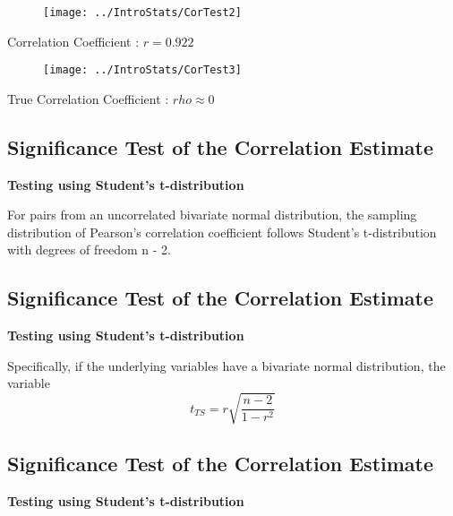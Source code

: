 \begin{figure}
\centering
\texttt{[image: ../IntroStats/CorTest2]}
\end{figure}
{

Correlation Coefficient : $r = 0.922$
}


\begin{figure}
\centering
\texttt{[image: ../IntroStats/CorTest3]}
\end{figure}

{

True Correlation Coefficient : $rho \approx 0$
}



\subsection{Significance Test of the Correlation Estimate}
\Large
\vspace{-1cm}
\textbf{Testing using Student's t-distribution}
\vspace{0.5cm}

For pairs from an uncorrelated bivariate normal distribution, the sampling distribution of Pearson's correlation coefficient follows Student's t-distribution with degrees of freedom n - 2. 



\subsection{Significance Test of the Correlation Estimate}
\Large
\vspace{-1cm}
\textbf{Testing using Student's t-distribution}
\vspace{0.5cm}

Specifically, if the underlying variables have a bivariate normal distribution, the variable
\[ t_{TS} = r\sqrt{\frac{n-2}{1 - r^2}} \]



\subsection{Significance Test of the Correlation Estimate}
\Large
\vspace{-1cm}
\textbf{Testing using Student's t-distribution}
\vspace{0.5cm}

